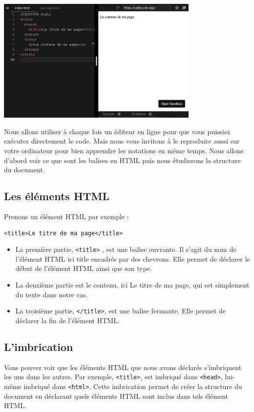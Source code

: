 \documentclass[a4paper]{article}
\begin{document}
\begin{center}
\includegraphics[width=10cm]{images/image01.png}
\end{center}

Nous allons utiliser à chaque fois un éditeur en ligne pour que vous puissiez exécuter directement le code. Mais nous vous invitons à le reproduire aussi sur votre ordinateur pour bien apprendre les notations en même temps. Nous allons d'abord voir ce que sont les balises en {\color{monOrange}HTML} puis nous étudierons la structure du document.

\subsection{Les éléments {\color{monOrange}HTML}}
Prenons un élément {\color{monOrange}HTML} par exemple :
\begin{verbatim}
<title>Le titre de ma page</title>
\end{verbatim}
\begin{itemize}
\item La première partie, {\tt <title>} , est une balise ouvrante. Il s'agit du nom de l'élément {\color{monOrange}HTML} ici {\color{monOrange}title} encadrés par des chevrons. Elle permet de déclarer le début de l'élément {\color{monOrange}HTML} ainsi que son type.

\item La deuxième partie est le contenu, ici {\color{monOrange}Le titre de ma page}, qui est simplement du texte dans notre cas.

\item La troisième partie, {\tt </title>}, est une balise fermante. Elle permet de déclarer la fin de l'élément {\color{monOrange}HTML}.
\end{itemize}


\subsection{L'imbrication}
Vous pouvez voir que les éléments {\color{monOrange}HTML} que nous avons déclarés s'imbriquent les uns dans les autres. Par exemple, {\tt <title>}, est imbriqué dans {\tt <head>}, lui-même imbriqué dans {\tt <html>}. Cette imbrication permet de créer la structure du document en déclarant quels éléments {\color{monOrange}HTML} sont inclus dans tels élément {\color{monOrange}HTML}.
\end{document}
